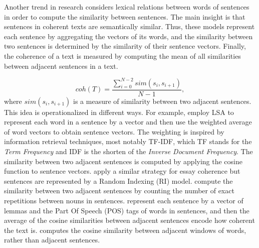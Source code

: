 Another trend in research considers lexical relations between words of sentences in order to compute the similarity between sentences.    
The main insight is that sentences in coherent texts are semantically similar. 
Thus, these models represent each sentence by aggregating the vectors of its words, and the similarity between two sentences is determined by the similarity of their sentence vectors. 
Finally, the coherence of a text is measured by computing the mean of all similarities between adjacent sentences in a text. 

\begin{equation}
coh(T) = \frac{\sum_{i=0}^{N-2}sim(s_i,s_{i+1})}{N-1},
\end{equation} 
%
where $sim(s_i, s_{i+1})$ is a measure of similarity between two adjacent sentences. 
This idea is operationalized in different ways.
For example,  employ LSA to represent each word in a sentence by a vector and then use the weighted average of word vectors to obtain sentence vectors. 
The weighting is inspired by information retrieval techniques, most notably TF-IDF, which TF stands for the \emph{Term Frequency} and IDF is the shorten of the \emph{Inverse Document Frequency}.
The similarity between two adjacent sentences is computed by applying the cosine function to sentence vectors. 
 apply a similar strategy for essay coherence but sentences are represented by a Random Indexing (RI) model. 
 compute the similarity between two adjacent sentences by counting the number of exact repetitions between nouns in sentences. 
 represent each sentence by a vector of lemmas and the Part Of Speech (POS) tags of words in sentences, and then the average of the cosine similarities between adjacent sentences encode how coherent the text is. 
 computes the cosine similarity between adjacent windows of words, rather than adjacent sentences. 

